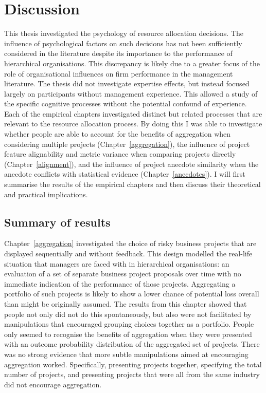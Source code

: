 \documentclass[a4paper, nobind, dvipsnames]{templates/ociamthesis}
\theoremstyle{definition}
\theoremstyle{definition}
\theoremstyle{definition}
\theoremstyle{definition}
\theoremstyle{remark}
\begin{document}
\hypertarget{discussion}{%
\chapter{Discussion}\label{discussion}}

\minitoc

This thesis investigated the psychology of resource allocation decisions. The
influence of psychological factors on such decisions has not been sufficiently
considered in the literature despite its importance to the performance of
hierarchical organisations. This discrepancy is likely due to a greater focus of
the role of organisational influences on firm performance in the management
literature. The thesis did not investigate expertise effects, but instead
focused largely on participants without management experience. This allowed a
study of the specific cognitive processes without the potential confound of
experience. Each of the empirical chapters investigated distinct but related
processes that are relevant to the resource allocation process. By doing this I
was able to investigate whether people are able to account for the benefits of
aggregation when considering multiple projects (Chapter~\ref{aggregation}), the
influence of project feature alignability and metric variance when comparing
projects directly (Chapter~\ref{alignment}), and the influence of project
anecdote similarity when the anecdote conflicts with statistical evidence
(Chapter~\ref{anecdotes}). I will first summarise the results of the empirical
chapters and then discuss their theoretical and practical implications.

\section{Summary of results}

Chapter~\ref{aggregation} investigated the choice of risky business projects
that are displayed sequentially and without feedback. This design modelled the
real-life situation that managers are faced with in hierarchical organisations:
an evaluation of a set of separate business project proposals over time with no
immediate indication of the performance of those projects. Aggregating a
portfolio of such projects is likely to show a lower chance of potential loss
overall than might be originally assumed. The results from this chapter showed
that people not only did not do this spontaneously, but also were not
facilitated by manipulations that encouraged grouping choices together as a
portfolio. People only seemed to recognise the benefits of aggregation when they
were presented with an outcome probability distribution of the aggregated set of
projects. There was no strong evidence that more subtle manipulations aimed at
encouraging aggregation worked. Specifically, presenting projects together,
specifying the total number of projects, and presenting projects that were all
from the same industry did not encourage aggregation.
\end{document}
